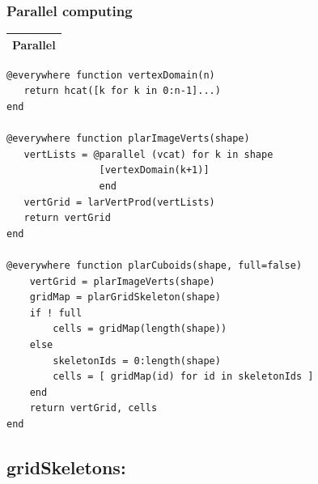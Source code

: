 \documentclass{article}
\begin{document}
\subsubsection{Parallel computing}
\vspace{1ex}
\begin{flushleft} \small
\begin{center}
\begin{tabular}{|p{16cm}|}
\hline
\cellcolor[gray]{.9}Parallel\\
\hline
\end{tabular}
\end{center}
\vspace{2ex}
\begin{list}{}{} \item
   \begin{Verbatim}[tabsize=4]
@everywhere function vertexDomain(n)
   return hcat([k for k in 0:n-1]...)
end

@everywhere function plarImageVerts(shape)
   vertLists = @parallel (vcat) for k in shape 
                [vertexDomain(k+1)]
                end
   vertGrid = larVertProd(vertLists)
   return vertGrid
end

@everywhere function plarCuboids(shape, full=false)
    vertGrid = plarImageVerts(shape)
    gridMap = plarGridSkeleton(shape)
    if ! full
        cells = gridMap(length(shape))
    else
        skeletonIds = 0:length(shape)
        cells = [ gridMap(id) for id in skeletonIds ]
    end
    return vertGrid, cells
end
   \end{Verbatim}
\end{list}

\vspace{-1ex}

\end{flushleft}
\subsection{gridSkeletons:}
\end{document}
